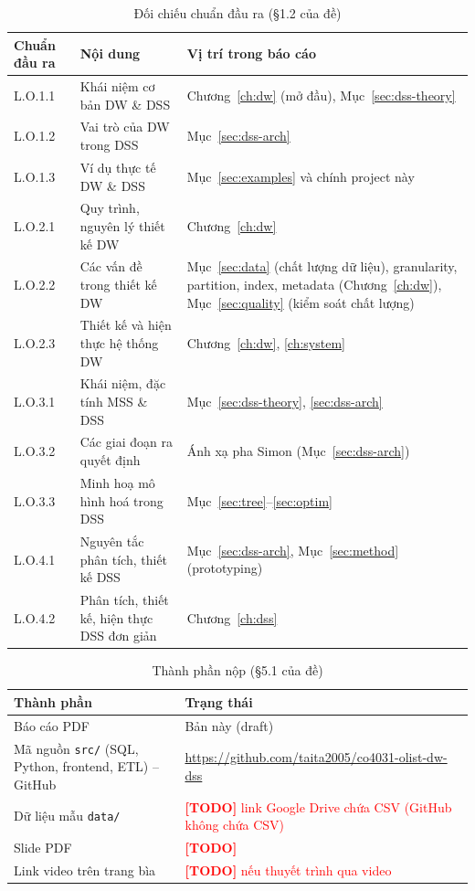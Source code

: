 \documentclass[12pt,a4paper]{report}
\newcommand{\todo}[1]{\textcolor{red}{\textbf{[TODO]} #1}}
\newcommand{\code}[1]{\texttt{#1}}
\renewcommand{\_}{\oldunderscore\allowbreak}
\begin{document}
\begin{table}[H]
\centering\small
\caption{Đối chiếu chuẩn đầu ra (§1.2 của đề)}
\begin{tabular}{lL{5.2cm}L{6.8cm}}
\toprule
Chuẩn đầu ra & Nội dung & Vị trí trong báo cáo \\
\midrule
L.O.1.1 & Khái niệm cơ bản DW \& DSS & Chương~\ref{ch:dw} (mở đầu), Mục~\ref{sec:dss-theory} \\
L.O.1.2 & Vai trò của DW trong DSS & Mục~\ref{sec:dss-arch} \\
L.O.1.3 & Ví dụ thực tế DW \& DSS & Mục~\ref{sec:examples} và chính project này \\
L.O.2.1 & Quy trình, nguyên lý thiết kế DW & Chương~\ref{ch:dw} \\
L.O.2.2 & Các vấn đề trong thiết kế DW & Mục~\ref{sec:data} (chất lượng dữ liệu), granularity, partition, index, metadata (Chương~\ref{ch:dw}), Mục~\ref{sec:quality} (kiểm soát chất lượng) \\
L.O.2.3 & Thiết kế và hiện thực hệ thống DW & Chương~\ref{ch:dw}, \ref{ch:system} \\
L.O.3.1 & Khái niệm, đặc tính MSS \& DSS & Mục~\ref{sec:dss-theory}, \ref{sec:dss-arch} \\
L.O.3.2 & Các giai đoạn ra quyết định & Ánh xạ pha Simon (Mục~\ref{sec:dss-arch}) \\
L.O.3.3 & Minh hoạ mô hình hoá trong DSS & Mục~\ref{sec:tree}--\ref{sec:optim} \\
L.O.4.1 & Nguyên tắc phân tích, thiết kế DSS & Mục~\ref{sec:dss-arch}, Mục~\ref{sec:method} (prototyping) \\
L.O.4.2 & Phân tích, thiết kế, hiện thực DSS đơn giản & Chương~\ref{ch:dss} \\
\bottomrule
\end{tabular}
\end{table}

\begin{table}[H]
\centering\small
\caption{Thành phần nộp (§5.1 của đề)}
\begin{tabular}{L{7cm}L{7.6cm}}
\toprule
Thành phần & Trạng thái \\
\midrule
Báo cáo PDF & Bản này (draft) \\
Mã nguồn \code{src/} (SQL, Python, frontend, ETL) -- GitHub & \url{https://github.com/taita2005/co4031-olist-dw-dss} \\
Dữ liệu mẫu \code{data/} & \todo{link Google Drive chứa CSV (GitHub không chứa CSV)} \\
Slide PDF & \todo{} \\
Link video trên trang bìa & \todo{nếu thuyết trình qua video} \\
\bottomrule
\end{tabular}
\end{table}
\end{document}
